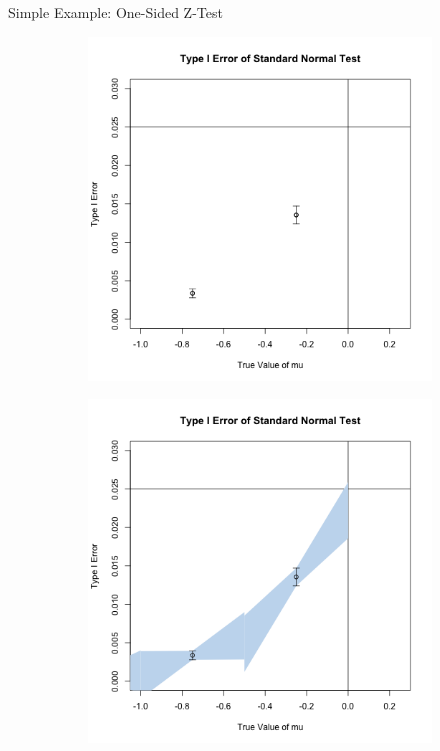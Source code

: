 \begin{frame}{Simple Example: One-Sided Z-Test}
\begin{figure}
\centering
\begin{subfigure}[b]{0.49\textwidth}
    \centering
    \includegraphics[width=\textwidth]{figures/z-test-13.png}
\end{subfigure}
\hfill
\begin{subfigure}[b]{0.49\textwidth}
    \centering
    \includegraphics[width=\textwidth]{figures/z-test-14.png}

\end{subfigure}
\end{figure}
\end{frame}
